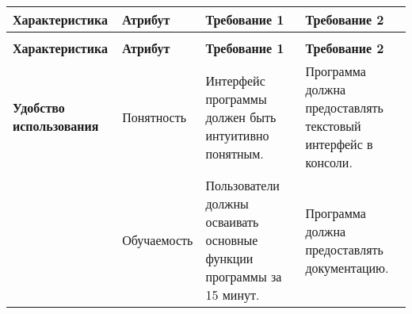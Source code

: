 \begin{longtable}{|p{3cm}|p{3cm}|p{4cm}|p{4cm}|}
	\caption{} \label{table:} \\

	\hline
	\textbf{Характеристика}
	& \textbf{Атрибут}
	& \textbf{Требование 1}
	& \textbf{Требование 2} \\
	\hline
	\endfirsthead

	\conttable{table:} \\

	\hline
	\textbf{Характеристика}
	& \textbf{Атрибут}
	& \textbf{Требование 1}
	& \textbf{Требование 2} \\
	\hline
	\endhead

	\textbf{Удобство использования}
	& Понятность
	& Интерфейс программы должен быть интуитивно понятным.
	& Программа должна предоставлять текстовый интерфейс в консоли. \\ \hline

	& Обучаемость
	& Пользователи должны осваивать основные функции программы за 15 минут.
	& Программа должна предоставлять документацию. \\ \hline

\end{longtable}

